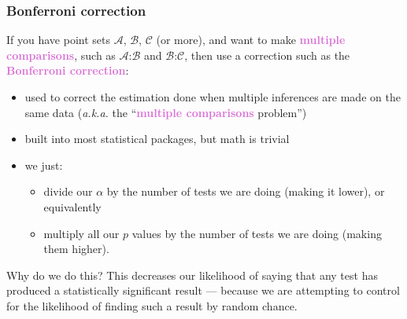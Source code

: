 \documentclass{beamer}
\newcommand{\aka}{\textit{a.k.a.}\xspace}
\newcommand{\key}[1]{\textcolor{orchid}{{\bf #1}}}
\begin{document}
\begin{frame}
\frametitle{Bonferroni correction}
If you have point sets
$\mathcal{A}$,
$\mathcal{B}$,
$\mathcal{C}$ (or more),
and want to make \key{multiple comparisons}, such as
$\mathcal{A}$:$\mathcal{B}$ and
$\mathcal{B}$:$\mathcal{C}$, then
use a correction such as the \key{Bonferroni correction}:
\begin{itemize}
\item used to correct the estimation done when multiple inferences
		are made on the same data (\aka the ``\key{multiple comparisons} problem'')
\pause
\item built into most statistical packages, but math is trivial
\item we just:
	\begin{itemize}
	\item divide our $\alpha$ by the number of tests we are doing (making it lower), or equivalently
	\pause
	\item multiply all our $p$ values by the number of tests we are doing (making them higher).
	\end{itemize}
\end{itemize}
\pause
\begin{block}{Why do we do this?}
This decreases our likelihood of saying that any test has produced
		a statistically significant result --- because we are attempting
		to control for the likelihood of finding such a result by
		random chance.
\end{block}
\end{frame}
\end{document}
